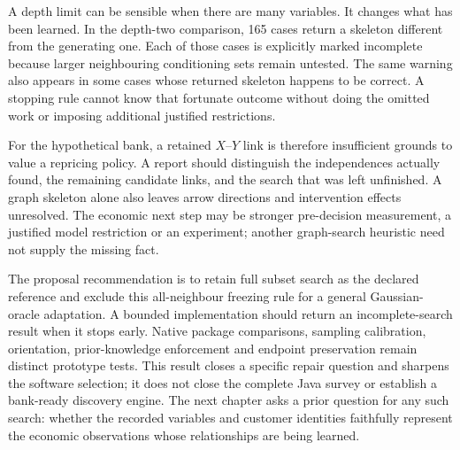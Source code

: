 A depth limit can be sensible when there are many variables. It changes
what has been learned. In the depth-two comparison, 165 cases return a
skeleton different from the generating one. Each of those cases is explicitly
marked incomplete because larger neighbouring conditioning sets remain
untested. The same warning also appears in some cases whose returned
skeleton happens to be correct. A stopping rule cannot know that fortunate
outcome without doing the omitted work or imposing additional justified
restrictions.

For the hypothetical bank, a retained $X$--$Y$ link is therefore insufficient
grounds to value a repricing policy. A report should distinguish the
independences actually found, the remaining candidate links, and the
search that was left unfinished. A graph skeleton alone also leaves arrow
directions and intervention effects unresolved. The economic next step may
be stronger pre-decision measurement, a justified model restriction or an
experiment; another graph-search heuristic need not supply the missing fact.

The proposal recommendation is to retain full subset search as the declared
reference and exclude this all-neighbour freezing rule for a general
Gaussian-oracle adaptation. A bounded implementation should return an
incomplete-search result when it stops early. Native package comparisons,
sampling calibration, orientation, prior-knowledge enforcement and endpoint
preservation remain distinct prototype tests. This result closes a specific
repair question and sharpens the software selection; it does not close the
complete Java survey or establish a bank-ready discovery engine. The next chapter asks a prior question for any such search: whether the recorded variables and customer identities faithfully represent the economic observations whose relationships are being learned.

